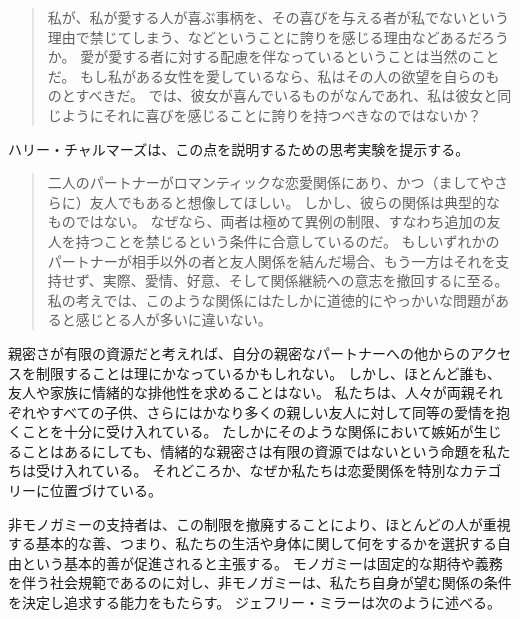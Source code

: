 \documentclass[paper=a4,book,openany]{jlreq}
\newcommand{\ig}[1]{}           %
\begin{document}
\begin{quote}

私が、私が愛する人が喜ぶ事柄を、その喜びを与える者が私でないという理由で禁じてしまう、などということに誇りを感じる理由などあるだろうか。
愛が愛する者に対する配慮を伴なっているということは当然のことだ。
もし私がある女性を愛しているなら、私はその人の欲望を自らのものとすべきだ。
では、彼女が喜んでいるものがなんであれ、私は彼女と同じようにそれに喜びを感じることに誇りを持つべきなのではないか？ \citep{sousa18:_how_think_yours_out_jealous}
\end{quote}

ハリー・チャルマーズは、この点を説明するための思考実験を提示する。

\begin{quote}

二人のパートナーがロマンティックな恋愛関係にあり、かつ（ましてやさらに）友人でもあると想像してほしい。
しかし、彼らの関係は典型的なものではない。
なぜなら、両者は極めて異例の制限、すなわち追加の友人を持つことを禁じるという条件に合意しているのだ。
もしいずれかのパートナーが相手以外の者と友人関係を結んだ場合、もう一方はそれを支持せず、実際、愛情、好意、そして関係継続への意志を撤回するに至る。
私の考えでは、このような関係にはたしかに道徳的にやっかいな問題があると感じとる人が多いに違いない。
\citep[p.225]{chalmers19:_is_monog_moral_permis}
\end{quote}

親密さが有限の資源だと考えれば、自分の親密なパートナーへの他からのアクセスを制限することは理にかなっているかもしれない。
しかし、ほとんど誰も、友人や家族に情緒的な排他性を求めることはない。
私たちは、人々が両親それぞれやすべての子供、さらにはかなり多くの親しい友人に対して同等の愛情を抱くことを十分に受け入れている。
たしかにそのような関係において嫉妬が生じることはあるにしても、情緒的な親密さは有限の資源ではないという命題を私たちは受け入れている。
それどころか、なぜか私たちは恋愛関係を特別なカテゴリーに位置づけている。

非モノガミーの支持者は、この制限を撤廃することにより、ほとんどの人が重視する基本的な善、つまり、私たちの生活や身体に関して何をするかを選択する自由という基本的善が促進されると主張する。
モノガミーは固定的な期待や義務を伴う社会規範であるのに対し、非モノガミーは、私たち自身が望む関係の条件を決定し追求する能力をもたらす。
ジェフリー・ミラー\ig{Geoffrey Miller}は次のように述べる。
\end{document}
